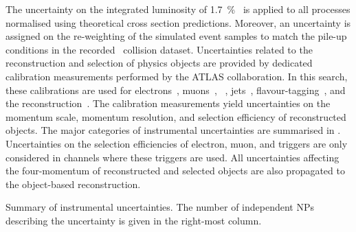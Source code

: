 The uncertainty on the integrated luminosity of
\SI{1.7}{\percent}~\cite{ATLAS-CONF-2019-021} is applied to all processes
normalised using theoretical cross section predictions. Moreover, an uncertainty
is assigned on the re-weighting of the simulated event samples to match the
pile-up conditions in the recorded \pp~collision dataset. Uncertainties related
to the reconstruction and selection of physics objects are provided by dedicated
calibration measurements performed by the ATLAS collaboration. In this search,
these calibrations are used for electrons~\cite{EGAM-2018-01,TRIG-2018-05},
muons~\cite{MUON-2018-03}, \tauhadvis~\cite{ATLAS-CONF-2017-029},
jets~\cite{JETM-2018-05},
flavour-tagging~\cite{FTAG-2018-01,FTAG-2020-08,FTAG-2021-002}, and the
\pTmissAbs reconstruction~\cite{ATLAS-CONF-2018-023}. The calibration
measurements yield uncertainties on the momentum scale, momentum resolution, and
selection efficiency of reconstructed objects. The major categories of
instrumental uncertainties are summarised in
. Uncertainties on the selection
efficiencies of electron, muon, and \tauhadvis triggers are only considered in
channels where these triggers are used. All uncertainties affecting the
four-momentum of reconstructed and selected objects are also propagated to the
object-based \pTmissAbs reconstruction.


\begin{table}[htbp]
  \centering

  \caption[Summary of instrumental uncertainties.]{Summary of instrumental
    uncertainties. The number of independent NPs describing the uncertainty is
    given in the right-most column.}%
  \label{tab:experimental_uncertainties_2}

  { \renewcommand{\arraystretch}{1.5}  }
\end{table}

